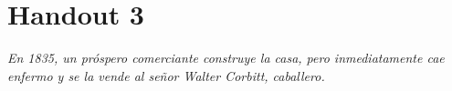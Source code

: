 \chapter{Handout 3}

\emph{En 1835, un próspero comerciante construye la casa, pero inmediatamente
cae enfermo y se la vende al señor Walter Corbitt, caballero.}

